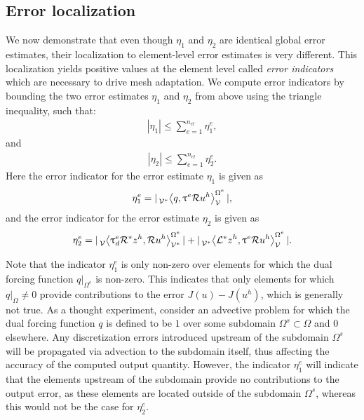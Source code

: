 \subsection{Error localization}

We now demonstrate that even though $\eta_1$ and
$\eta_2$ are identical global error estimates,
their localization to element-level error estimates
is very different. This localization yields positive
values at the element level called \emph{error indicators}
which are necessary to drive mesh adaptation.
We compute error indicators by bounding the
two error estimates $\eta_1$ and $\eta_2$ from
above using the triangle inequality, such that:
%
\begin{gather}
| \eta_1  | \leq  \sum_{e=1}^{n_{el}} \eta_1^e,
\end{gather}
%
and
%
\begin{gather}
| \eta_2 | \leq \sum_{e=1}^{n_{el}} \eta_2^e.
\end{gather}
%
Here the error indicator for the error estimate
$\eta_1$ is given as
%
\begin{gather}
\eta_1^e = | \,{}_{\mathcal{V}^*}^{}\!\left< {q}, {\uptau^e \mathcal{R} u^h} \right>_{\mathcal{V}}^{\Omega^e} |,
\end{gather}
%
and the error indicator for the error estimate
$\eta_2$ is given as
%
\begin{gather}
\eta_2^e = | \,{}_{\mathcal{V}}^{}\!\left< {\uptau^e_d \mathcal{R}^* z^h}, {\mathcal{R} u^h} \right>_{\mathcal{V}^*}^{\Omega^e} | +
| \,{}_{\mathcal{V}^*}^{}\!\left< {\mathcal{L}^* z^h}, {\uptau^e \mathcal{R} u^h} \right>_{\mathcal{V}}^{\Omega^e} |.
\end{gather}

Note that the indicator $\eta^e_1$ is only non-zero
over elements for which the dual forcing function
$q | _{\Omega^e}$ is non-zero. This indicates that only
elements for which $q|_{\Omega} \neq 0$ provide
contributions to the error $J(u) - J(u^h)$, which is
generally not true. As a thought experiment,
consider an advective problem
for which the dual forcing function $q$ is defined to be
$1$ over some subdomain $\Omega^s \subset \Omega$
and $0$ elsewhere. Any discretization errors
introduced upstream of the subdomain $\Omega^s$
will be propagated via advection to the subdomain
itself, thus affecting the accuracy of the computed
output quantity. However, the indicator $\eta^e_1$
will indicate that the elements upstream of the
subdomain provide no contributions to the output
error, as these elements are located outside of
the subdomain $\Omega^s$, whereas this would not
be the case for $\eta^e_2$.

